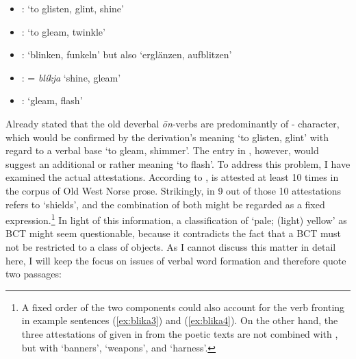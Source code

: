 \documentclass[output=paper,colorlinks,citecolor=brown]{langscibook}
\begin{document}
\begin{itemize}
\item {}: ‘to glisten, glint, shine’
\item {}: ‘to gleam, twinkle’
\item {}: ‘blinken, funkeln’ but also ‘erglänzen, aufblitzen'
\item {}: = \textit{blíkja} ‘shine, gleam’
\item {}: ‘gleam, flash’
\end{itemize}

Already \citet[240]{KraheMeid1969} stated that the old deverbal \textit{ōn}-verbs are predominantly of - character, which would be confirmed by the derivation’s meaning ‘to glisten, glint’ with regard to a verbal base  ‘to gleam, shimmer’. The entry in , however, would suggest an additional  or rather  meaning ‘to flash’. To address this problem, I have examined the actual attestations. According to ,  is attested at least 10 times in the corpus of Old West Norse prose. Strikingly, in 9 out of those 10 attestations  refers to  ‘shields’, and the combination of both might be regarded as a fixed expression.\footnote{A fixed order of the two components could also account for the verb fronting in example sentences (\ref{ex:blika3}) and (\ref{ex:blika4}). On the other hand, the three attestations of  given in  from the poetic texts are not combined with , but with  ‘banners’,  ‘weapons’, and  ‘harness’.} In light of this information, a classification of  ‘pale; (light) yellow’ as BCT  might seem questionable, because it contradicts the fact that a BCT must not be restricted to a class of objects. As I cannot discuss this matter in detail here, I will keep the focus on issues of verbal word formation and therefore quote two passages:
 
\end{document}
